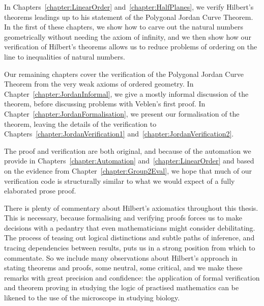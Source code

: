 In Chapters~\ref{chapter:LinearOrder} and~\ref{chapter:HalfPlanes}, we verify Hilbert's theorems leadings up to his statement of the Polygonal Jordan Curve Theorem. In the first of these chapters, we show how to carve out the natural numbers geometrically without needing the axiom of infinity, and we then show how our verification of Hilbert's theorems allows us to reduce problems of ordering on the line to inequalities of natural numbers.

Our remaining chapters cover the verification of the Polygonal Jordan Curve Theorem from the very weak axioms of ordered geometry. In Chapter~\ref{chapter:JordanInformal}, we give a mostly informal discussion of the theorem, before discussing problems with Veblen's first proof. In Chapter~\ref{chapter:JordanFormalisation}, we present our formalisation of the theorem, leaving the details of the verification to Chapters~\ref{chapter:JordanVerification1} and~\ref{chapter:JordanVerification2}.

The proof and verification are both original, and because of the automation we provide in Chapters~\ref{chapter:Automation} and~\ref{chapter:LinearOrder} and based on the evidence from Chapter~\ref{chapter:Group2Eval}, we hope that much of our verification code is structurally similar to what we would expect of a fully elaborated prose proof.

There is plenty of commentary about Hilbert's axiomatics throughout this thesis. This is necessary, because formalising and verifying proofs forces us to make decisions with a pedantry that even mathematicians might consider debilitating. The process of teasing out logical distinctions and subtle paths of inference, and tracing dependencies between results, puts us in a strong position from which to commentate. So we include many observations about Hilbert's approach in stating theorems and proofs, some neutral, some critical, and we make these remarks with great precision and confidence: the application of formal verification and theorem proving in studying the logic of practised mathematics can be likened to the use of the microscope in studying biology.

